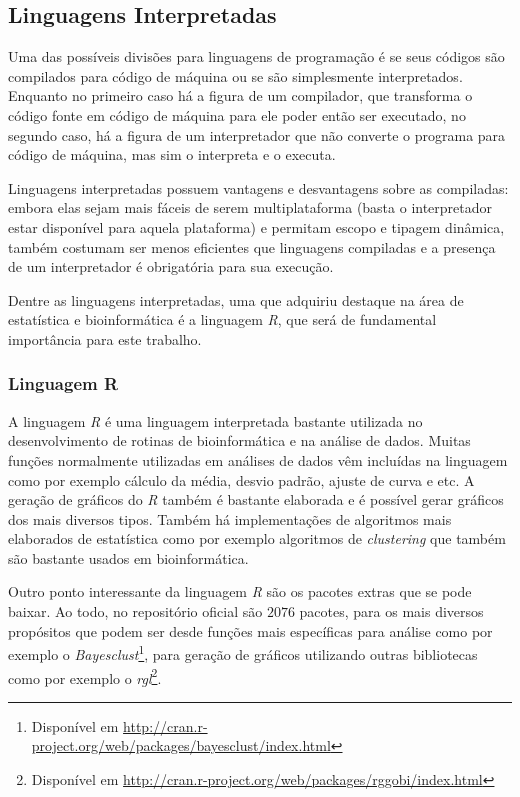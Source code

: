 \subsection{Linguagens Interpretadas}

Uma das possíveis divisões para linguagens de programação é se seus códigos são compilados para código de máquina ou se são simplesmente 
interpretados. Enquanto no primeiro caso há a figura de um compilador, que transforma o código fonte em código de máquina 
para ele poder então ser executado, no segundo caso,
há a figura de um interpretador que não converte o programa para 
código de máquina, mas sim o interpreta e o executa. 

Linguagens interpretadas possuem vantagens e desvantagens sobre as compiladas: embora elas sejam mais fáceis 
de serem multiplataforma (basta o interpretador
estar disponível para aquela plataforma) e permitam escopo e tipagem dinâmica, também costumam ser menos eficientes que linguagens compiladas e 
a presença de um interpretador é obrigatória para sua execução. 

Dentre as linguagens interpretadas, uma que adquiriu destaque na área de estatística e bioinformática é a linguagem \emph{R}, que 
será de fundamental importância para este trabalho. 


\subsubsection{Linguagem R}

A linguagem \emph{R} é uma linguagem interpretada bastante utilizada no desenvolvimento de rotinas de bioinformática e na análise de
dados. Muitas funções normalmente utilizadas em análises de dados vêm incluídas na linguagem como por exemplo cálculo da
 média, desvio padrão, ajuste de curva e etc. A geração de gráficos do \emph{R} também é bastante elaborada e é possível 
gerar gráficos dos mais diversos tipos. Também há implementações de algoritmos mais elaborados de estatística como por 
exemplo algoritmos de \emph{clustering} que também são bastante usados em bioinformática.

Outro ponto interessante da linguagem \emph{R} são os pacotes extras que se pode baixar. Ao todo, no repositório oficial
são $2076$ pacotes, para os mais diversos propósitos que podem ser desde funções mais específicas para análise como 
por exemplo o \emph{Bayesclust}\footnote{Disponível em \url{http://cran.r-project.org/web/packages/bayesclust/index.html}}, 
para geração de gráficos utilizando outras bibliotecas como por exemplo o 
\emph{rgl}\footnote{Disponível em \url{http://cran.r-project.org/web/packages/rggobi/index.html}}. 

